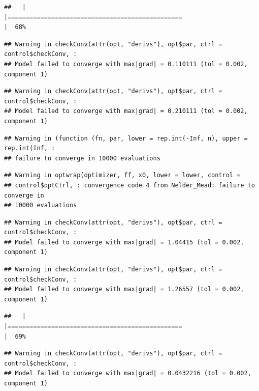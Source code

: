 \documentclass[
  12pt,
]{book}
\begin{document}
\begin{verbatim}
##   |                                                                              |================================================                      |  68%
\end{verbatim}

\begin{verbatim}
## Warning in checkConv(attr(opt, "derivs"), opt$par, ctrl = control$checkConv, :
## Model failed to converge with max|grad| = 0.110111 (tol = 0.002, component 1)
\end{verbatim}

\begin{verbatim}
## Warning in checkConv(attr(opt, "derivs"), opt$par, ctrl = control$checkConv, :
## Model failed to converge with max|grad| = 0.210111 (tol = 0.002, component 1)
\end{verbatim}

\begin{verbatim}
## Warning in (function (fn, par, lower = rep.int(-Inf, n), upper = rep.int(Inf, :
## failure to converge in 10000 evaluations
\end{verbatim}

\begin{verbatim}
## Warning in optwrap(optimizer, ff, x0, lower = lower, control =
## control$optCtrl, : convergence code 4 from Nelder_Mead: failure to converge in
## 10000 evaluations
\end{verbatim}

\begin{verbatim}
## Warning in checkConv(attr(opt, "derivs"), opt$par, ctrl = control$checkConv, :
## Model failed to converge with max|grad| = 1.04415 (tol = 0.002, component 1)
\end{verbatim}

\begin{verbatim}
## Warning in checkConv(attr(opt, "derivs"), opt$par, ctrl = control$checkConv, :
## Model failed to converge with max|grad| = 1.26557 (tol = 0.002, component 1)
\end{verbatim}

\begin{verbatim}
##   |                                                                              |================================================                      |  69%
\end{verbatim}

\begin{verbatim}
## Warning in checkConv(attr(opt, "derivs"), opt$par, ctrl = control$checkConv, :
## Model failed to converge with max|grad| = 0.0432216 (tol = 0.002, component 1)
\end{verbatim}
\end{document}
